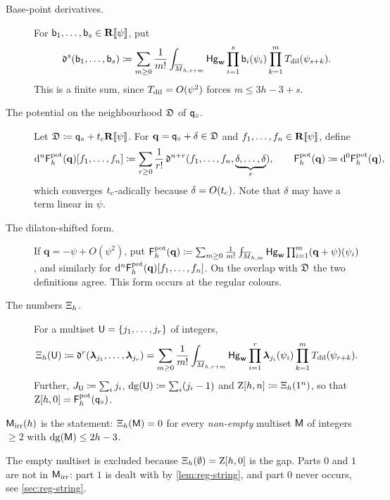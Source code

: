 \begin{defn}[{\Lg{Definition~2.8}}]
\label{def:set-fpot}
\begin{description}
\item[Base-point derivatives.] For $\mathsf{b}_1,\ldots,\mathsf{b}_s\in\mathbf{R}[\![ \psi ]\!]$, put
\[
\mathfrak{d}^s(\mathsf{b}_1,\ldots,\mathsf{b}_s)\coloneqq\sum_{m\geq 0}\frac{1}{m!}\int_{\overline{M}_{h,s+m}}\mathsf{Hg}_{\mathbf{w}}\prod_{i=1}^s\mathsf{b}_i(\psi_i)\prod_{k=1}^{m}T_{\mathrm{dil}}(\psi_{s+k}).
\]
This is a finite sum, since $T_{\mathrm{dil}}=O(\psi^2)$ forces $m\leq3h-3+s$.
\item[The potential on the neighbourhood $\mathfrak{D}$ of $\mathsf{q}_{\circ}$.] Let $\mathfrak{D}\coloneqq\mathsf{q}_{\circ}+t_{\mathrm{c}}\mathbf{R}[\![ \psi ]\!]$. For $\mathbf{q}=\mathsf{q}_{\circ}+\delta\in\mathfrak{D}$ and $f_1,\ldots,f_n\in\mathbf{R}[\![ \psi ]\!]$, define
\[
\mathrm{d}^n\mathsf{F}^{\mathrm{pot}}_h(\mathbf{q})[f_1,\ldots,f_n]\coloneqq\sum_{r\geq0}\frac{1}{r!}\,\mathfrak{d}^{n+r}(f_1,\ldots,f_n,\underbrace{\delta,\ldots,\delta}_{r}),\qquad\mathsf{F}^{\mathrm{pot}}_h(\mathbf{q})\coloneqq\mathrm{d}^0\mathsf{F}^{\mathrm{pot}}_h(\mathbf{q}),
\]
which converges $t_{\mathrm{c}}$-adically because $\delta=O(t_{\mathrm{c}})$. Note that $\delta$ may have a term linear in $\psi$.
\item[The dilaton-shifted form.] If $\mathbf{q}=-\psi+O(\psi^2)$, put $\mathsf{F}^{\mathrm{pot}}_h(\mathbf{q})\coloneqq\sum_{m\geq 0}\frac{1}{m!}\int_{\overline{M}_{h,m}}\mathsf{Hg}_{\mathbf{w}}\prod_{i=1}^m(\mathbf{q}+\psi)(\psi_i)$, and similarly for $\mathrm{d}^n\mathsf{F}^{\mathrm{pot}}_h(\mathbf{q})[f_1,\ldots,f_n]$. On the overlap with $\mathfrak{D}$ the two definitions agree. This form occurs at the regular colours.
\item[The numbers $\Xi_h$.] For a multiset $\mathsf{U}=\{j_1,\ldots,j_r\}$ of integers,
\[
\Xi_h(\mathsf{U})\coloneqq\mathfrak{d}^r(\boldsymbol{\lambda}_{j_1},\ldots,\boldsymbol{\lambda}_{j_r})=\sum_{m\geq 0}\frac{1}{m!}\int_{\overline{M}_{h,r+m}}\mathsf{Hg}_{\mathbf{w}}\prod_{i=1}^{r}\boldsymbol{\lambda}_{j_i}(\psi_i)\prod_{k=1}^{m}T_{\mathrm{dil}}(\psi_{r+k}).
\]
Further, $J_{\mathsf{U}}\coloneqq\sum_ij_i$, $\mathrm{dg}(\mathsf{U})\coloneqq\sum_i(j_i-1)$ and $\mathrm{Z}[h,n]\coloneqq\Xi_h(1^n)$, so that $\mathrm{Z}[h,0]=\mathsf{F}^{\mathrm{pot}}_h(\mathsf{q}_{\circ})$.
\end{description}
\end{defn}

\begin{defn}
\label{def:set-mirr}
$\mathsf{M}_{\mathrm{irr}}(h)$ is the statement: $\Xi_h(\mathsf{M})=0$ for every \emph{non-empty} multiset $\mathsf{M}$ of integers $\geq2$ with $\mathrm{dg}(\mathsf{M})\leq2h-3$.
\end{defn}

The empty multiset is excluded because $\Xi_h(\emptyset)=\mathrm{Z}[h,0]$ is the gap. Parts $0$ and $1$ are not in $\mathsf{M}_{\mathrm{irr}}$: part $1$ is dealt with by \cref{lem:reg-string}, and part $0$ never occurs, see \cref{sec:reg-string}.

